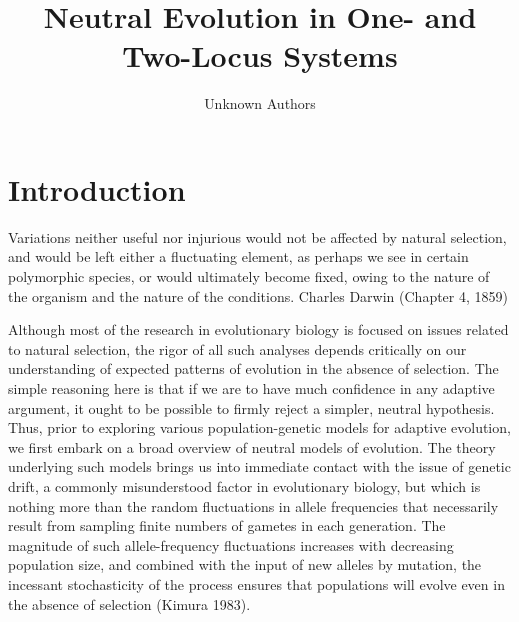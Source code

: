 \documentclass{article}
\title{Neutral Evolution in One-
and Two-Locus Systems}
\author{Unknown Authors}
\date{}
\begin{document}
\maketitle

\begin{abstract}

\end{abstract}

\section{Introduction}
Variations neither useful nor injurious would not be affected by natural selection, and would be left either a fluctuating element, as perhaps we see in certain polymorphic species, or would ultimately become fixed, owing to the nature of the organism and the nature of the conditions.
Charles Darwin (Chapter 4, 1859)

Although most of the research in evolutionary biology is focused on issues related to natural selection, the rigor of all such analyses depends critically on our understanding of expected patterns of evolution in the absence of selection. The simple reasoning here is that if we are to have much confidence in any adaptive argument, it ought to be possible to firmly reject a simpler, neutral hypothesis. Thus, prior to exploring various population-genetic models for adaptive evolution, we first embark on a broad overview of neutral models of evolution. The theory underlying such models brings us into immediate contact with the issue of genetic drift, a commonly misunderstood factor in evolutionary biology, but which is nothing more than the random fluctuations in allele frequencies that necessarily result from sampling finite numbers of gametes in each generation. The magnitude of such allele-frequency fluctuations increases with decreasing population size, and combined with the input of new alleles by mutation, the incessant stochasticity of the process ensures that populations will evolve even in the absence of selection (Kimura 1983).
\end{document}
